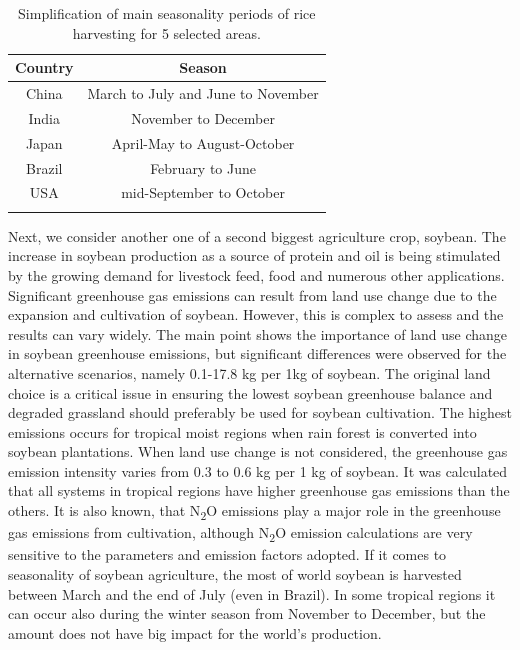 \vfill

\begin{table}[h!]
	\centering
	\begin{tabular}{c c} 
 	\hline
 	Country & Season\\ 
	 \hline\hline
	 China & March to July and June to November \\ 
	 India & November to December  \\
	 Japan & April-May to August-October \\
	 Brazil & February to June \\
	 USA &  mid-September to October \\ 
	 \hline
	 &\\
	\end{tabular}
	 \caption{Simplification of main seasonality periods of rice harvesting for 5 selected areas.}
	 \label{tab:Seasonality_rice}
\end{table}

Next, we consider another one of a second biggest agriculture crop, soybean. The increase in soybean production as a source of protein and oil is being stimulated by the growing demand for livestock feed, food and numerous other applications. Significant greenhouse gas emissions can result from land use change due to the expansion and cultivation of soybean. However, this is complex to assess and the results can vary widely. The main point shows the importance of land use change in soybean greenhouse emissions, but significant differences were observed for the alternative scenarios, namely 0.1-17.8 kg \co per 1kg of soybean. The original land choice is a critical issue in ensuring the lowest soybean greenhouse balance and degraded grassland should preferably be used for soybean cultivation. The highest emissions occurs for tropical moist regions when rain forest is converted into soybean plantations. When land use change is not considered, the greenhouse gas emission intensity varies from 0.3 to 0.6 kg \co per 1 kg of soybean. It was calculated that all systems in tropical regions have higher greenhouse gas emissions than the others. It is also known, that N\textsubscript{2}O emissions play a major role in the greenhouse gas emissions from cultivation, although N\textsubscript{2}O emission calculations are very sensitive to the parameters and emission factors adopted.
If it comes to seasonality of soybean agriculture, the most of world soybean is harvested between March and the end of July (even in Brazil). In some tropical regions it can occur also during the winter season from November to December, but the amount does not have big impact for the world's production.


